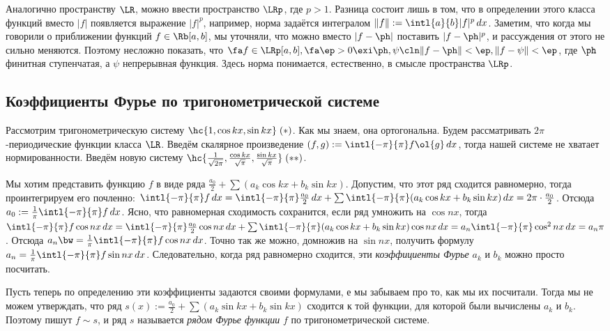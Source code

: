 \documentclass[a4paper]{article}
\newcommand{\intlab}{\intl{a}{b}}
\newcommand{\intlpp}{\intl{-\pi}{\pi}}
\newcommand{\frpi}{\frac{1}{\pi}}
\begin{document}
Аналогично пространству $\LR$, можно ввести пространство $\LRp$, где $p > 1$. Разница состоит лишь
в том, что в определении этого класса функций вместо $|f|$ появляется выражение $|f|^p$, например,
норма задаётся интегралом $\|f\| := \intlab |f|^p\,d x$. Заметим, что когда мы говорили о
приближении функций $f \in\Rb[a,b]$, мы уточняли, что можно вместо $|f - \ph|$ поставить $|f -
\ph|^p$, и рассуждения от этого не сильно меняются. Поэтому несложно показать, что $\fa f \in
\LRp[a,b], \fa \ep > 0 \exi \ph, \psi\cln \|f-\ph\|< \ep, \|f - \psi\| < \ep$, где $\ph$ финитная
ступенчатая, а $\psi$ непрерывная функция. Здесь норма понимается, естественно, в смысле
пространства $\LRp$.

\subsection{Коэффициенты Фурье по тригонометрической системе}

Рассмотрим тригонометрическую систему $\hc{1, \cos kx, \sin kx}\; (*)$. Как мы знаем, она
ортогональна. Будем рассматривать $2\pi$-периодические функции класса $\LR$. Введём скалярное
произведение $(f,g) := \intlpp f\ol{g} \,d x$, тогда нашей системе не хватает нормированности.
Введём новую систему $\hc{\frac{1}{\sqrt{2\pi}}, \frac{\cos kx}{\sqrt{\pi}}, \frac{\sin
kx}{\sqrt{\pi}}} \;(**)$.

Мы хотим представить функцию $f$ в виде ряда $\frac{a_0}{2} + \sum(a_k \cos kx + b_k \sin kx)$.
Допустим, что этот ряд сходится равномерно, тогда проинтегрируем его почленно: $\intlpp f \,d x =
\intlpp \frac{a_0}{2}\,d x + \sum \intlpp (a_k\cos kx + b_k \sin kx) \,d x = 2\pi\cdot
\frac{a_0}{2}$. Отсюда $a_0 := \frpi \intlpp f \,d x$. Ясно, что равномерная сходимость
сохранится, если ряд умножить на $\cos nx$, тогда $\intlpp f \cos nx \,d x = \intlpp
\frac{a_0}{2}\cos nx \,d x + \sum \intlpp (a_k \cos kx + b_k \sin kx)\cos nx \,d x = a_n \intlpp
\cos^2 n x \,d x = a_n \pi$. Отсюда $a_n \bw= \frpi \intlpp f \cos nx \,d x$. Точно так же можно,
домножив на $\sin nx$, получить формулу $a_n = \frpi \intlpp f \sin nx \,d x$. Следовательно,
когда ряд равномерно сходится, эти \emph{коэффициенты Фурье} $a_k$ и $b_k$ можно просто
посчитать.

Пусть теперь по определению эти коэффициенты задаются своими формулами, е мы забываем про то, как мы их посчитали. Тогда мы не можем утверждать,
что ряд $s(x) := \frac{a_0}{2} + \sum (a_k \sin kx + b_k \sin kx)$ сходится к той функции, для которой были вычислены $a_k$ и $b_k$. Поэтому
пишут $f \sim s$, и ряд $s$ называется \emph{рядом Фурье функции} $f$ по тригонометрической системе.
\end{document}

